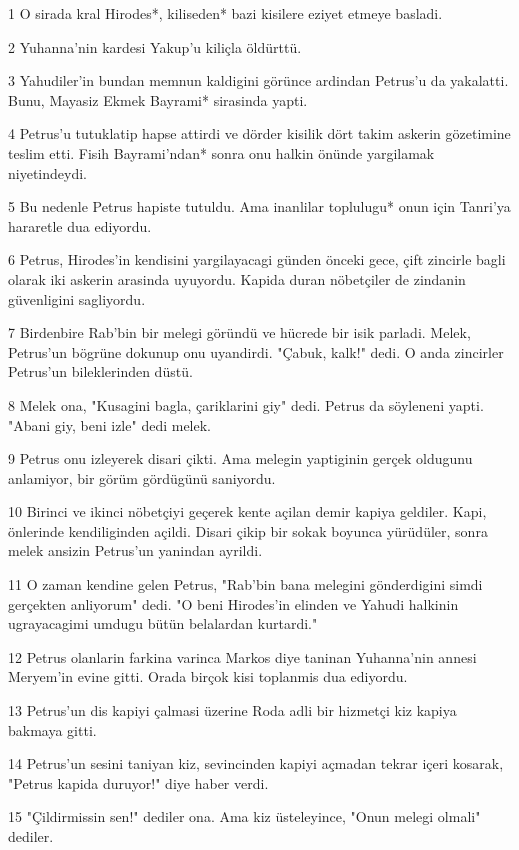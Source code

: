 \par 1 O sirada kral Hirodes*, kiliseden* bazi kisilere eziyet etmeye basladi.
\par 2 Yuhanna'nin kardesi Yakup'u kiliçla öldürttü.
\par 3 Yahudiler'in bundan memnun kaldigini görünce ardindan Petrus'u da yakalatti. Bunu, Mayasiz Ekmek Bayrami* sirasinda yapti.
\par 4 Petrus'u tutuklatip hapse attirdi ve dörder kisilik dört takim askerin gözetimine teslim etti. Fisih Bayrami'ndan* sonra onu halkin önünde yargilamak niyetindeydi.
\par 5 Bu nedenle Petrus hapiste tutuldu. Ama inanlilar toplulugu* onun için Tanri'ya hararetle dua ediyordu.
\par 6 Petrus, Hirodes'in kendisini yargilayacagi günden önceki gece, çift zincirle bagli olarak iki askerin arasinda uyuyordu. Kapida duran nöbetçiler de zindanin güvenligini sagliyordu.
\par 7 Birdenbire Rab'bin bir melegi göründü ve hücrede bir isik parladi. Melek, Petrus'un bögrüne dokunup onu uyandirdi. "Çabuk, kalk!" dedi. O anda zincirler Petrus'un bileklerinden düstü.
\par 8 Melek ona, "Kusagini bagla, çariklarini giy" dedi. Petrus da söyleneni yapti. "Abani giy, beni izle" dedi melek.
\par 9 Petrus onu izleyerek disari çikti. Ama melegin yaptiginin gerçek oldugunu anlamiyor, bir görüm gördügünü saniyordu.
\par 10 Birinci ve ikinci nöbetçiyi geçerek kente açilan demir kapiya geldiler. Kapi, önlerinde kendiliginden açildi. Disari çikip bir sokak boyunca yürüdüler, sonra melek ansizin Petrus'un yanindan ayrildi.
\par 11 O zaman kendine gelen Petrus, "Rab'bin bana melegini gönderdigini simdi gerçekten anliyorum" dedi. "O beni Hirodes'in elinden ve Yahudi halkinin ugrayacagimi umdugu bütün belalardan kurtardi."
\par 12 Petrus olanlarin farkina varinca Markos diye taninan Yuhanna'nin annesi Meryem'in evine gitti. Orada birçok kisi toplanmis dua ediyordu.
\par 13 Petrus'un dis kapiyi çalmasi üzerine Roda adli bir hizmetçi kiz kapiya bakmaya gitti.
\par 14 Petrus'un sesini taniyan kiz, sevincinden kapiyi açmadan tekrar içeri kosarak, "Petrus kapida duruyor!" diye haber verdi.
\par 15 "Çildirmissin sen!" dediler ona. Ama kiz üsteleyince, "Onun melegi olmali" dediler.

